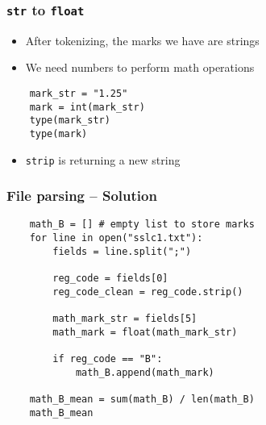 \begin{frame}[fragile]
  \frametitle{\texttt{str} to \texttt{float}}
  \begin{itemize}
  \item After tokenizing, the marks we have are strings
  \item We need numbers to perform math operations
  \end{itemize}
  \begin{lstlisting}
    mark_str = "1.25"
    mark = int(mark_str)
    type(mark_str)
    type(mark)
  \end{lstlisting}
  \begin{itemize}
  \item \texttt{strip} is returning a new string 
  \end{itemize}
\end{frame}

\begin{frame}[fragile]
  \frametitle{File parsing -- Solution}
  \begin{lstlisting}
    math_B = [] # empty list to store marks
    for line in open("sslc1.txt"):
        fields = line.split(";")

        reg_code = fields[0]
        reg_code_clean = reg_code.strip()

        math_mark_str = fields[5]
        math_mark = float(math_mark_str)

        if reg_code == "B":
            math_B.append(math_mark)

    math_B_mean = sum(math_B) / len(math_B)
    math_B_mean
  \end{lstlisting}
\end{frame}
